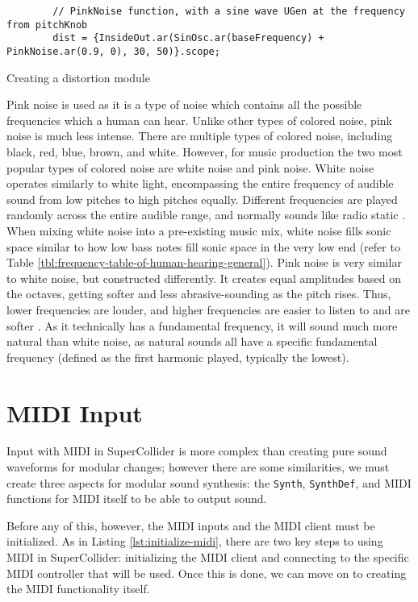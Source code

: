 \begin{listing}
	\begin{lstlisting}
		// PinkNoise function, with a sine wave UGen at the frequency from pitchKnob
		dist = {InsideOut.ar(SinOsc.ar(baseFrequency) + PinkNoise.ar(0.9, 0), 30, 50)}.scope;
	\end{lstlisting}
	\caption{Creating a distortion module}
	\label{lst:distortion-waveforms}
\end{listing}

Pink noise is used as it is a type of noise which contains all the possible frequencies which a human can hear. Unlike other types of colored noise, pink noise is much less intense. There are multiple types of colored noise, including black, red, blue, brown, and white. However, for music production the two most popular types of colored noise are white noise and pink noise. White noise operates similarly to white light, encompassing the entire frequency of audible sound from low pitches to high pitches equally. Different frequencies are played randomly across the entire audible range, and normally sounds like radio static \cite{Unison_2021}. When mixing white noise into a pre-existing music mix, white noise fills sonic space similar to how low bass notes fill sonic space in the very low end (refer to Table \ref{tbl:frequency-table-of-human-hearing-general}). Pink noise is very similar to white noise, but constructed differently. It creates equal amplitudes based on the octaves, getting softer and less abrasive-sounding as the pitch rises. Thus, lower frequencies are louder, and higher frequencies are easier to listen to and are softer \cite{Unison_2021}. As it technically has a fundamental frequency, it will sound much more natural than white noise, as natural sounds all have a specific fundamental frequency (defined as the first harmonic played, typically the lowest).

\section{MIDI Input}\label{section:midi-input}

Input with MIDI in SuperCollider is more complex than creating pure sound waveforms for modular changes; however there are some similarities, we must create three aspects for modular sound synthesis: the \texttt{Synth}, \texttt{SynthDef}, and MIDI functions for MIDI itself to be able to output sound. 

Before any of this, however, the MIDI inputs and the MIDI client must be initialized. As in Listing \ref{lst:initialize-midi}, there are two key steps to using MIDI in SuperCollider: initializing the MIDI client and connecting to the specific MIDI controller that will be used. Once this is done, we can move on to creating the MIDI functionality itself.

